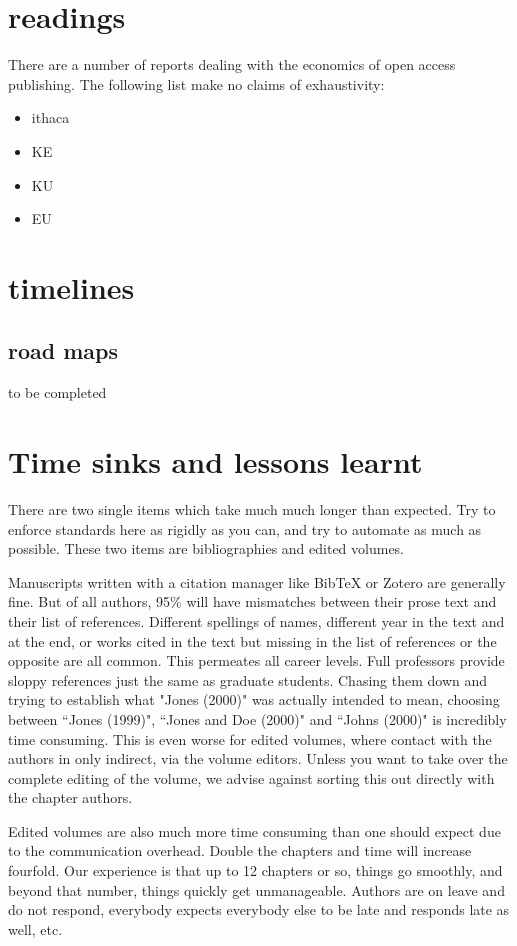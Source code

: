 \documentclass[guidelines,nonflat,modfonts] {langsci/langscibook}
\begin{document}
\chapter{readings} 
There are a number of reports dealing with the economics of open access publishing. The following list make no claims of exhaustivity:

\begin{itemize}
 \item ithaca 
 \item KE 
 \item KU 
 \item EU
\end{itemize}


\chapter{timelines}
\section{road maps}

to be completed 

\chapter{Time sinks and lessons learnt}
There are two single items which take much much longer than expected. Try to enforce standards here as rigidly as you can, and try to automate as much as possible. These two items are bibliographies and edited volumes. 

Manuscripts written with a citation manager like BibTeX or Zotero are generally fine. But of all authors, 95\% will have mismatches between their prose text and their list of references. Different spellings of names, different year in the text and at the end, or works cited in the text but missing in the list of references or the opposite are all common. This permeates all career levels. Full professors provide sloppy references just the same as graduate students. Chasing them down and trying to establish what "Jones (2000)" was actually intended to mean, choosing between ``Jones (1999)", ``Jones and Doe (2000)" and ``Johns (2000)" is incredibly time consuming. This is even worse for edited volumes, where contact with the authors in only indirect, via the volume editors. Unless you want to take over the complete editing of the volume, we advise against sorting this out directly with the chapter authors. 

Edited volumes are also much more  time consuming than one should expect due to the communication overhead. Double the chapters and time will increase fourfold. Our experience is that up to 12 chapters or so, things go smoothly, and beyond that number, things quickly get unmanageable. Authors are on leave and do not respond, everybody expects everybody else to be late and responds late as well, etc. 
 
\end{document}
